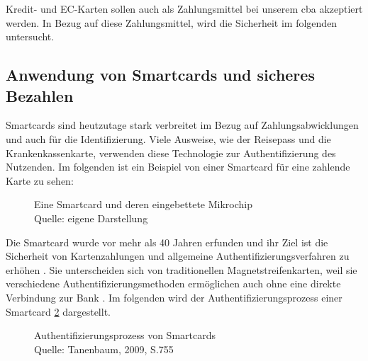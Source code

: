 Kredit- und EC-Karten sollen auch als Zahlungsmittel bei unserem \acrshort{cba} akzeptiert werden. 
In Bezug auf diese Zahlungsmittel, wird die Sicherheit im folgenden untersucht.

\subsection{Anwendung von Smartcards und sicheres Bezahlen}
Smartcards sind heutzutage stark verbreitet im Bezug auf Zahlungsabwicklungen und auch für die Identifizierung.
Viele Ausweise, wie der Reisepass und die Krankenkassenkarte, verwenden diese Technologie zur Authentifizierung
des Nutzenden. Im folgenden ist ein Beispiel von einer Smartcard für eine zahlende Karte zu sehen: 

\begin{figure}[H]
   \caption{Eine Smartcard und deren eingebettete Mikrochip\\Quelle: eigene Darstellung}
   \label{fig:eigenes_Bild}
\end{figure}

Die Smartcard wurde vor mehr als 40 Jahren erfunden und ihr Ziel ist die Sicherheit von Kartenzahlungen und 
allgemeine Authentifizierungsverfahren zu erhöhen \cite{refip:JFSB}. Sie unterscheiden sich von traditionellen 
Magnetstreifenkarten, weil sie verschiedene Authentifizierungsmethoden ermöglichen auch ohne eine direkte 
Verbindung zur Bank \cite{refbook:ATMS}. Im folgenden wird der Authentifizierungsprozess einer Smartcard 
\ref{fig:refbook_ATMS} dargestellt. 

\begin{figure}[H]
   \caption{Authentifizierungsprozess von Smartcards\\Quelle: Tanenbaum, 2009, S.755}
   \label{fig:refbook_ATMS}
\end{figure}

